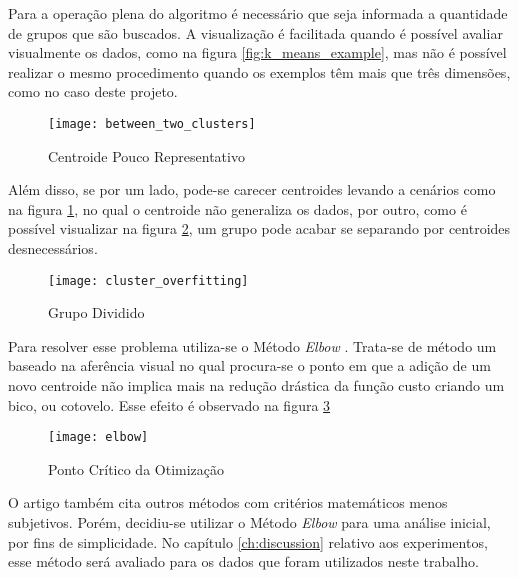 Para a operação plena do algoritmo é necessário que seja informada a quantidade de grupos que são buscados. A visualização é facilitada quando é possível avaliar visualmente os dados, como na figura \ref{fig:k_means_example}, mas não é possível realizar o mesmo procedimento quando os exemplos têm mais que três dimensões, como no caso deste projeto.

\begin{figure}
\texttt{[image: between\_two\_clusters]}
\caption[Centroide Pouco Representativo]{Centroide Pouco Representativo} \label{fig:between_two_clusters}
\end{figure}

Além disso, se por um lado, pode-se carecer centroides levando a cenários como na figura \ref{fig:between_two_clusters}, no qual o centroide não generaliza os dados, por outro, como é possível visualizar na figura \ref{fig:cluster_overfitting}, um grupo pode acabar se separando por centroides desnecessários.

\begin{figure}[htbp]
\centering
\texttt{[image: cluster\_overfitting]}
\caption[Grupo Dividido]{Grupo Dividido} \label{fig:cluster_overfitting}
\end{figure}

Para resolver esse problema utiliza-se o Método \textit{Elbow} \citep{kodinariya2013review}. Trata-se de método um baseado na aferência visual no qual procura-se o ponto em que a adição de um novo centroide não implica mais na redução drástica da função custo criando um bico, ou cotovelo. Esse efeito é observado na figura \ref{fig:elbow}

\begin{figure}[htbp]
\centering
\texttt{[image: elbow]}
\caption[Ponto Crítico da Otimização]{Ponto Crítico da Otimização} \label{fig:elbow}
\end{figure}

O artigo \citep{kodinariya2013review} também cita outros métodos com critérios matemáticos menos subjetivos. Porém, decidiu-se utilizar o Método \textit{Elbow} para uma análise inicial, por fins de simplicidade. No capítulo \ref{ch:discussion} relativo aos experimentos, esse método será avaliado para os dados que foram utilizados neste trabalho.


